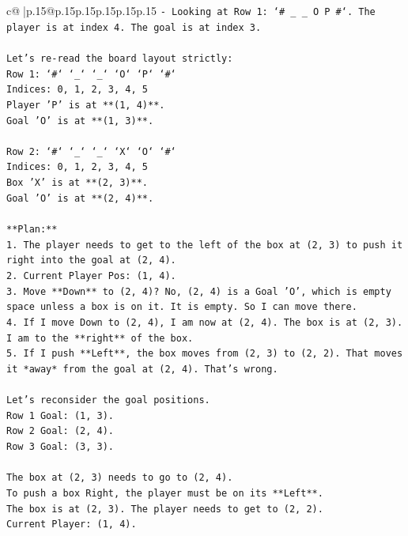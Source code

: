 \documentclass{article}
\begin{document}
{\begin{supertabular}{c@{$\;$}|p{.15\linewidth}@{}p{.15\linewidth}p{.15\linewidth}p{.15\linewidth}p{.15\linewidth}p{.15\linewidth}}
{{{\texttt{{-} Looking at Row 1: `\# \_ \_ O P \#`. The player is at index 4. The goal is at index 3.} \\
\\ 
\texttt{Let's re{-}read the board layout strictly:} \\
\texttt{Row 1: `\#` `\_` `\_` `O` `P` `\#`} \\
\texttt{Indices: 0, 1, 2, 3, 4, 5} \\
\texttt{Player 'P' is at **(1, 4)**.} \\
\texttt{Goal 'O' is at **(1, 3)**.} \\
\\ 
\texttt{Row 2: `\#` `\_` `\_` `X` `O` `\#`} \\
\texttt{Indices: 0, 1, 2, 3, 4, 5} \\
\texttt{Box 'X' is at **(2, 3)**.} \\
\texttt{Goal 'O' is at **(2, 4)**.} \\
\\ 
\texttt{**Plan:**} \\
\texttt{1. The player needs to get to the left of the box at (2, 3) to push it right into the goal at (2, 4).} \\
\texttt{2. Current Player Pos: (1, 4).} \\
\texttt{3. Move **Down** to (2, 4)? No, (2, 4) is a Goal 'O', which is empty space unless a box is on it. It is empty. So I can move there.} \\
\texttt{4. If I move Down to (2, 4), I am now at (2, 4). The box is at (2, 3). I am to the **right** of the box.} \\
\texttt{5. If I push **Left**, the box moves from (2, 3) to (2, 2). That moves it *away* from the goal at (2, 4). That's wrong.} \\
\\ 
\texttt{Let's reconsider the goal positions.} \\
\texttt{Row 1 Goal: (1, 3).} \\
\texttt{Row 2 Goal: (2, 4).} \\
\texttt{Row 3 Goal: (3, 3).} \\
\\ 
\texttt{The box at (2, 3) needs to go to (2, 4).} \\
\texttt{To push a box Right, the player must be on its **Left**.} \\
\texttt{The box is at (2, 3). The player needs to get to (2, 2).} \\
\texttt{Current Player: (1, 4).} \\
}}}
\end{supertabular}}
\end{document}
